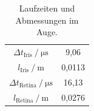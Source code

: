\begin{table}
    \centering
    \caption{Laufzeiten und Abmessungen im Auge.}
    \label{tab:3} 
    \begin{tabular}{| c | c |}
    \hline 
    {$\Delta t_\text{Iris} \mathbin{/} \unit{\micro\second}$}    &       9,06   \\
    {$l_\text{Iris} \mathbin{/} \unit{\meter}$}                  &       0,0113 \\
    {$\Delta t_\text{Retina} \mathbin{/} \unit{\micro\second}$}  &      16,13   \\
    {$l_\text{Retina} \mathbin{/} \unit{\meter}$}                &       0,0276 \\
    \hline
    \end{tabular}  
\end{table}